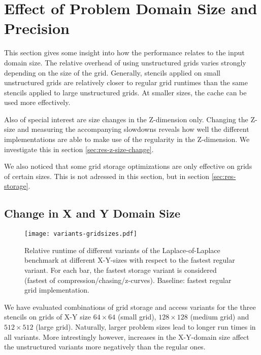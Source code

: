 \section{Effect of Problem Domain Size and Precision} \label{sec:res-size}

This section gives some insight into how the performance relates to the input domain size. The relative overhead of using unstructured grids varies strongly depending on the size of the grid. Generally, stencils applied on small unstructured grids are relatively closer to regular grid runtimes than the same stencils applied to large unstructured grids. At smaller sizes, the cache can be used more effectively.

Also of special interest are size changes in the Z-dimension only. Changing the Z-size and measuring the accompanying slowdowns reveals how well the different implementations are able to make use of the regularity in the Z-dimension. We investigate this in section \ref{sec:res-z-size-change}.

We also noticed that some grid storage optimizations are only effective on grids of certain sizes. This is not adressed in this section, but in section \ref{sec:res-storage}.

\subsection{Change in X and Y Domain Size}

\begin{figure}
	\texttt{[image: variants-gridsizes.pdf]}
	\caption{\label{fig:variants-gridsizes} Relative runtime of different variants of the Laplace-of-Laplace benchmark at different X-Y-sizes with respect to the fastest regular variant. For each bar, the fastest storage variant is considered (fastest of compression/chasing/z-curves). Baseline: fastest regular grid implementation.}
\end{figure}

We have evaluated combinations of grid storage and access variants for the three stencils on grids of X-Y size $64\times 64$ (small grid), $128\times 128$ (medium grid) and $512\times 512$ (large grid). Naturally, larger problem sizes lead to longer run times in all variants. More intrestingly however, increases in the X-Y-domain size affect the unstructured variants more negatively than the regular ones.

